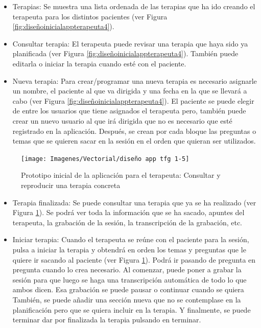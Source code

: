 \begin{itemize}
	\item Terapias: Se muestra una lista ordenada de las terapias que ha ido creando el terapeuta para los distintos pacientes (ver Figura \ref{fig:diseñoinicialappterapeuta4}).
	\item Consultar terapia: El terapeuta puede revisar una terapia que haya sido ya planificada (ver Figura \ref{fig:diseñoinicialappterapeuta4}). También puede editarla o iniciar la terapia cuando esté con el paciente. 
	\item Nueva terapia: Para crear/programar una nueva terapia es necesario asignarle un nombre, el paciente al que va dirigida y una fecha en la que se llevará a cabo (ver Figura \ref{fig:diseñoinicialappterapeuta4}). El paciente se puede elegir de entre los usuarios que tiene asignados el terapeuta pero, también puede crear un nuevo usuario al que irá dirigida que no es necesario que esté registrado en la aplicación. Después, se crean por cada bloque las preguntas o temas que se quieren sacar en la sesión en el orden que quieran ser utilizados.
\end{itemize}

\begin{figure}[h]
	\centering
	\texttt{[image: Imagenes/Vectorial/diseño app tfg 1-5]}
	\caption{Prototipo inicial de la aplicación para el terapeuta: Consultar y reproducir una terapia concreta}
	\label{fig:diseñoinicialappterapeuta5}
\end{figure}


\begin{itemize}
	\item Terapia finalizada: Se puede consultar una terapia que ya se ha realizado (ver Figura \ref{fig:diseñoinicialappterapeuta5}). Se podrá ver toda la información que se ha sacado, apuntes del terapeuta, la grabación de la sesión, la transcripción de la grabación, etc.
	\item Iniciar terapia: Cuando el terapeuta se reúne con el paciente para la sesión, pulsa a iniciar la terapia y obtendrá en orden los temas y preguntas que le quiere ir sacando al paciente (ver Figura \ref{fig:diseñoinicialappterapeuta5}). Podrá ir pasando de pregunta en pregunta cuando lo crea necesario. Al comenzar, puede poner a grabar la sesión para que luego se haga una transcripción automática de todo lo que ambos dicen. Esa grabación se puede pausar o continuar cuando se quiera También, se puede añadir una sección nueva que no se contemplase en la planificación pero que se quiera incluir en la terapia. Y finalmente, se puede terminar dar por finalizada la terapia pulsando en terminar. 
\end{itemize}

